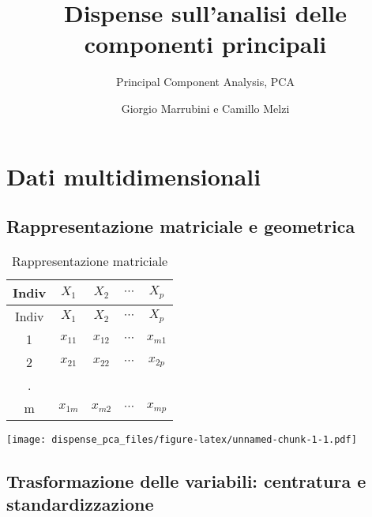 \documentclass[
  11pt,
]{book}
\title{Dispense sull'analisi delle componenti principali}
\subtitle{Principal Component Analysis, PCA}
\author{Giorgio Marrubini e Camillo Melzi}
\date{}
\begin{document}
\maketitle

{
\hypersetup{linkcolor=}
\setcounter{tocdepth}{1}
\tableofcontents
}
\hypertarget{section}{%
\chapter*{}\label{section}}

\hypertarget{dati-multidimensionali}{%
\chapter{Dati multidimensionali}\label{dati-multidimensionali}}

\hypertarget{rappresentazione-matriciale-e-geometrica}{%
\section{Rappresentazione matriciale e geometrica}\label{rappresentazione-matriciale-e-geometrica}}

\begin{longtable}[]{@{}ccccc@{}}
\caption{\label{tab:RegrMult} Rappresentazione matriciale}\tabularnewline
\toprule
Indiv & \(X_1\) & \(X_2\) & \(\cdots\) & \(X_p\) \\
\midrule
\endfirsthead
\toprule
Indiv & \(X_1\) & \(X_2\) & \(\cdots\) & \(X_p\) \\
\midrule
\endhead
1 & \(x_{11}\) & \(x_{12}\) & \(\cdots\) & \(x_{m1}\) \\
2 & \(x_{21}\) & \(x_{22}\) & \(\cdots\) & \(x_{2p}\) \\
. & & & & \\
m & \(x_{1m}\) & \(x_{m2}\) & \(\cdots\) & \(x_{mp}\) \\
\bottomrule
\end{longtable}

\texttt{[image: dispense\_pca\_files/figure-latex/unnamed-chunk-1-1.pdf]}

\hypertarget{trasformazione-delle-variabili-centratura-e-standardizzazione}{%
\section{Trasformazione delle variabili: centratura e standardizzazione}\label{trasformazione-delle-variabili-centratura-e-standardizzazione}}
\end{document}
